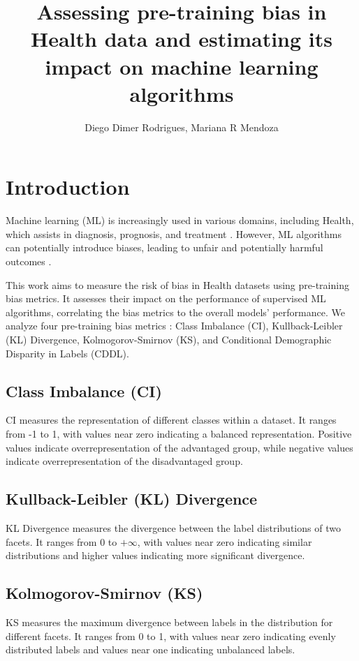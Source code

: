 \documentclass[12pt]{article}
\title{Assessing pre-training bias in Health data and estimating its impact on machine learning algorithms}
\author{Diego Dimer Rodrigues\inst{1}, Mariana R Mendoza\inst{1}}
\begin{document}
 

\maketitle

\begin{abstract}
\end{abstract}
     
\section{Introduction}
Machine learning (ML) is increasingly used in various domains, including Health, which assists in diagnosis, prognosis, and treatment \cite{Chen2021}. 
However, ML algorithms can potentially introduce biases, leading to unfair and potentially harmful outcomes \cite{obermeyer2019dissecting,juhn2022assessing}. 

This work aims to measure the risk of bias in Health datasets using pre-training bias metrics. It assesses their impact on the performance of supervised ML algorithms, correlating the bias metrics to the overall models' performance. 
We analyze four pre-training bias metrics \cite{Hardt2021}: Class Imbalance (CI), Kullback-Leibler (KL) Divergence, Kolmogorov-Smirnov (KS), and Conditional Demographic Disparity in Labels (CDDL).

\subsection{Class Imbalance (CI)}
CI measures the representation of different classes within a dataset. It ranges from -1 to 1, with values near zero indicating a balanced representation. Positive values indicate overrepresentation of the advantaged group, while negative values indicate overrepresentation of the disadvantaged group.

\subsection{Kullback-Leibler (KL) Divergence}
KL Divergence measures the divergence between the label distributions of two facets. It ranges from 0 to $+\infty$, with values near zero indicating similar distributions and higher values indicating more significant divergence.

\subsection{Kolmogorov-Smirnov (KS)}
KS measures the maximum divergence between labels in the distribution for different facets. It ranges from 0 to 1, with values near zero indicating evenly distributed labels and values near one indicating unbalanced labels.
\end{document}
